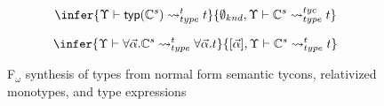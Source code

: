 \begin{figure}
{    
    
    \begin{equation}
      \infer{\Upsilon\vdash \mathsf{typ}(\mathbb{C}^s) \leadsto^t_{type} t}
      {\emptyset_{knd},\Upsilon\vdash \mathbb{C}^s \leadsto^{tyc}_{type} t }
    \end{equation}

    \begin{equation}
      \infer{\Upsilon\vdash \forall\vec{\alpha}.\mathbb{C}^s 
        \leadsto^t_{type} \forall\vec{\alpha}.t}
      {[\vec{\alpha}],\Upsilon\vdash \mathbb{C}^s \leadsto^t_{type} t}
    \end{equation}
}
\caption{F$_\omega$ synthesis of types from normal form semantic tycons, relativized monotypes, and type expressions}
\label{fig:f-semtyc-mt-te}
\end{figure}

